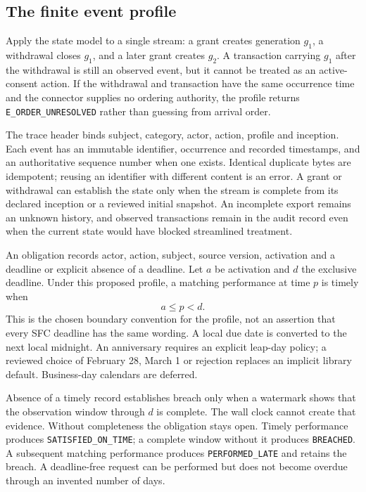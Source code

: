 \subsection{The finite event profile}
\label{merge:P-03b-event-contract:00}


Apply the state model to a single stream: a grant creates generation $g_1$,
a withdrawal closes $g_1$, and a later grant creates $g_2$. A transaction carrying
$g_1$ after the withdrawal is still an observed event, but it cannot be treated as
an active-consent action. If the withdrawal and transaction have the same
occurrence time and the connector supplies no ordering authority, the profile
returns \texttt{E\_ORDER\_UNRESOLVED} rather than guessing from arrival order.

The trace header binds subject, category, actor, action, profile and inception.
Each event has an immutable identifier, occurrence and recorded timestamps, and
an authoritative sequence number when one exists. Identical duplicate bytes are
idempotent; reusing an identifier with different content is an error. A grant or
withdrawal can establish the state only when the stream is complete from its
declared inception or a reviewed initial snapshot. An incomplete export remains
an unknown history, and observed transactions remain in the audit record even
when the current state would have blocked streamlined treatment.


An obligation records actor, action, subject, source version, activation and a
deadline or explicit absence of a deadline. Let $a$ be activation and $d$ the
exclusive deadline. Under this proposed profile, a matching performance at time
$p$ is timely when
\begin{equation}
 a\leq p<d.
 \label{eq:timely}
\end{equation}
This is the chosen boundary convention for the profile, not an assertion that
every SFC deadline has the same wording. A local due date is converted to the
next local midnight. An anniversary requires an explicit leap-day policy; a
reviewed choice of February 28, March 1 or rejection replaces an implicit library
default. Business-day calendars are deferred.

Absence of a timely record establishes breach only when a watermark shows that
the observation window through $d$ is complete. The wall clock cannot create
that evidence. Without completeness the obligation stays open. Timely performance
produces \texttt{SATISFIED\_ON\_TIME}; a complete window without it produces
\texttt{BREACHED}. A subsequent matching performance produces
\texttt{PERFORMED\_LATE} and retains the breach. A deadline-free request can be
performed but does not become overdue through an invented number of days.


